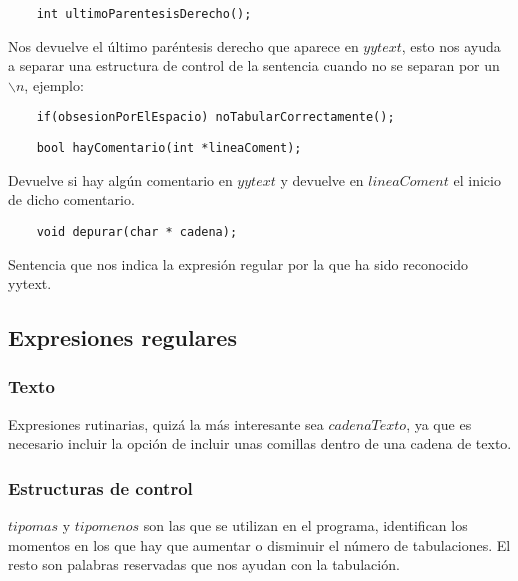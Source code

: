 \documentclass[11pt,spanish]{article} %
\begin{document}
\vspace{0.5cm}
\begin{lstlisting}
	int ultimoParentesisDerecho();
\end{lstlisting}
Nos devuelve el último paréntesis derecho que aparece en $yytext$, esto nos ayuda a separar una estructura de control de la sentencia cuando no se separan por un $\backslash n$, ejemplo: 
\begin{lstlisting}
	if(obsesionPorElEspacio) noTabularCorrectamente();
\end{lstlisting}


\vspace{0.5cm}
\begin{lstlisting}
	bool hayComentario(int *lineaComent);
\end{lstlisting}
Devuelve si hay algún comentario en $yytext$ y devuelve en $lineaComent$ el inicio de dicho comentario.\\


\vspace{0.5cm}
\begin{lstlisting}
	void depurar(char * cadena);
\end{lstlisting}
Sentencia que nos indica la expresión regular por la que ha sido reconocido yytext.




\subsection{Expresiones regulares}
\subsubsection{Texto}

Expresiones rutinarias, quizá la más interesante sea $cadenaTexto$, ya que es necesario incluir la opción de incluir unas comillas dentro de una cadena de texto.

\vspace{0.4cm}
\subsubsection{Estructuras de control}

$tipomas$ y $tipomenos$ son las que se utilizan en el programa, identifican los momentos en los que hay que aumentar o disminuir el número de tabulaciones.
El resto son palabras reservadas que nos ayudan con la tabulación.

\vspace{0.4cm}
\end{document}
